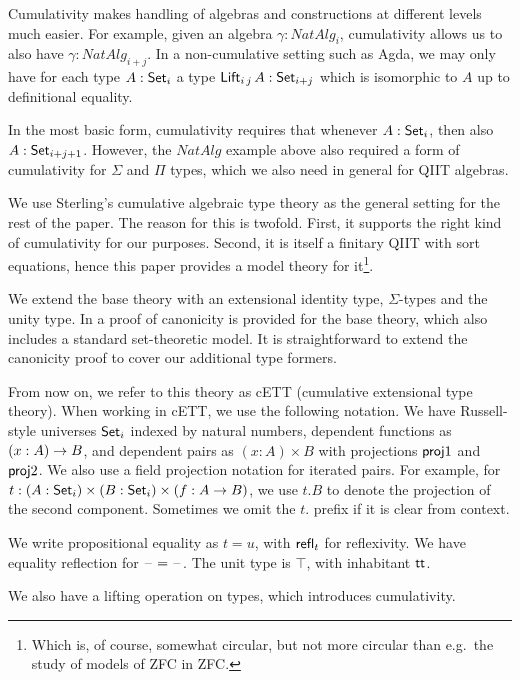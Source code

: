 \documentclass{llncs}
\begin{document}
Cumulativity makes handling of algebras and constructions at different levels
much easier. For example, given an algebra $\gamma : NatAlg_i$, cumulativity
allows us to also have $\gamma : NatAlg_{i+j}$. In a non-cumulative setting such
as Agda, we may only have for each type $A : \Set_i$ a type $\mathsf{Lift}_{i\,j}\,A :
\Set_{i+j}$ which is isomorphic to $A$ up to definitional equality.

In the most basic form, cumulativity requires that whenever $A : \Set_i$, then
also $A : \Set_{i+j+1}$. However, the $NatAlg$ example above also required a
form of cumulativity for $\Sigma$ and $\Pi$ types, which we also need in general
for QIIT algebras.

We use Sterling's cumulative algebraic type theory \cite{TODO} as the general
setting for the rest of the paper. The reason for this is twofold. First, it
supports the right kind of cumulativity for our purposes. Second, it is itself a
finitary QIIT with sort equations, hence this paper provides a model theory for
it\footnote{Which is, of course, somewhat circular, but not more circular than
  e.g.\ the study of models of ZFC in ZFC.}.

We extend the base theory with an extensional identity type, $\Sigma$-types and
the unity type. In \cite{TODO} a proof of canonicity is provided for the base
theory, which also includes a standard set-theoretic model. It is
straightforward to extend the canonicity proof to cover our additional type
formers.

From now on, we refer to this theory as cETT (cumulative extensional type
theory). When working in cETT, we use the following notation. We
have Russell-style universes $\Set_i$ indexed by natural numbers, dependent
functions as $(x : A)\ra B$, and dependent pairs as $(x : A)\times B$ with
projections $\proj1$ and $\proj2$. We also use a field projection notation
for iterated pairs. For example, for $t : (A : \Set_i) \times (B : \Set_i)
\times (f : A \ra B)$, we use $t.B$ to denote the projection of the second
component. Sometimes we omit the $t.$ prefix if it is clear from context.

We write propositional equality as $t = u$, with $\refl_t$ for reflexivity. We
have equality reflection for $\blank=\blank$. The unit type is $\top$, with
inhabitant $\tt$.

We also have a lifting operation on types, which introduces cumulativity.
\end{document}
